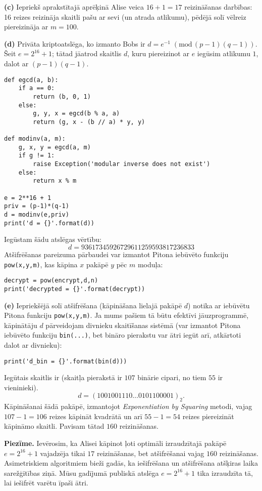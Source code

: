 \documentclass[11pt]{article}
\begin{document}
{\bf (c)} Iepriekš aprakstītajā aprēķinā Alise veica $16+1 = 17$ reizināšanas darbības:
16 reizes reizināja skaitli pašu ar sevi (un atrada atlikumu), pēdējā solī vēlreiz
piereizināja ar $m=100$.

{\bf (d)} Privāta kriptoatslēga, ko izmanto Bobs ir $d = e^{-1}\;(\text{mod}\,(p-1)(q-1))$.
Šeit $e = 2^{16} + 1$; tātad jāatrod skaitlis $d$, kuru piereizinot ar $e$ iegūsim atlikumu $1$,
dalot ar $(p-1)(q-1)$.
\begin{verbatim}
def egcd(a, b):
    if a == 0:
        return (b, 0, 1)
    else:
        g, y, x = egcd(b % a, a)
        return (g, x - (b // a) * y, y)

def modinv(a, m):
    g, x, y = egcd(a, m)
    if g != 1:
        raise Exception('modular inverse does not exist')
    else:
        return x % m

e = 2**16 + 1
priv = (p-1)*(q-1)
d = modinv(e,priv)
print('d = {}'.format(d))
\end{verbatim}
Iegūstam šādu atslēgas vērtību:
$$d = 93617345926729611259593817236833$$
Atšifrēšanas pareizuma pārbaudei var izmantot Pitona iebūvēto funkciju {\tt pow(x,y,m)}, kas
kāpina $x$ pakāpē $y$ pēc $m$ moduļa:
\begin{verbatim}
decrypt = pow(encrypt,d,n)
print('decrypted = {}'.format(decrypt))
\end{verbatim}


{\bf (e)} Iepriekšējā solī atšifrēšana (kāpināšana lielajā pakāpē $d$)
notika ar iebūvētu Pitona funkciju {\tt pow(x,y,m)}. Ja mums pašiem tā
būtu efektīvi jāuzprogrammē,
kāpinātāju $d$ pārveidojam divnieku skaitīšanas sistēmā (var izmantot Pitona
iebūvēto funkciju {\tt bin(...)}, bet bināro pierakstu var ātri iegūt arī, atkārtoti dalot ar divnieku):
\begin{verbatim}
print('d_bin = {}'.format(bin(d)))
\end{verbatim}
Iegūtais skaitlis ir (skaitļa pierakstā ir $107$ binārie cipari, no tiem $55$ ir vieninieki).
$$d = (1001001110\ldots{}0101100001)_2.$$
Kāpināšanai šādā pakāpē, izmantojot {\em Exponentiation by Squaring} metodi,
vajag $107-1 = 106$ reizes kāpināt kvadrātā un arī $55-1 = 54$ reizes
piereizināt kāpināmo skaitli. Pavisam tātad $160$ reizināšanas.

{\bf Piezīme.} Ievērosim, ka Alisei kāpinot ļoti optimāli izraudzītajā pakāpē $e = 2^{16}+1$ vajadzēja tikai $17$
reizināšanas, bet atšifrēšanai vajag $160$ reizināšanas.
Asimetriskiem algoritmiem bieži gadās, ka
iešifrēšana un atšifrēšana atšķiras laika sarežģītības ziņā. Mūsu gadījumā
publiskā atslēga $e = 2^{16}+1$ tika
izraudzīta tā, lai iešifrēt varētu īpaši ātri.
\end{document}
